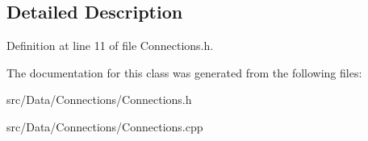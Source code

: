 \subsection{Detailed Description}


Definition at line 11 of file Connections.h.



The documentation for this class was generated from the following files:\begin{DoxyCompactItemize}
\item 
src/Data/Connections/Connections.h\item 
src/Data/Connections/Connections.cpp\end{DoxyCompactItemize}
